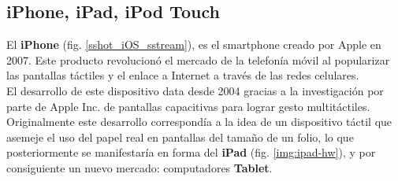 		
		
		
		

	

		\subsection{iPhone, iPad, iPod Touch}
		
El \textbf{iPhone} (fig. \ref{sshot_iOS_sstream}), es el smartphone creado por Apple en 2007. Este producto revolucionó el mercado de la telefonía móvil al popularizar las pantallas táctiles y el enlace a Internet a través de las redes celulares. \\

El desarrollo de este dispositivo data desde 2004 gracias a la investigación por parte de Apple Inc. de pantallas capacitivas para lograr gesto multitáctiles. Originalmente este desarrollo correspondía a la idea de un dispositivo táctil que asemeje el uso del papel real en pantallas del tamaño de un folio, lo que posteriormente se manifestaría en forma del \textbf{iPad} (fig. \ref{img:ipad-hw}), y por consiguiente un nuevo mercado: computadores \textbf{Tablet}.\\

